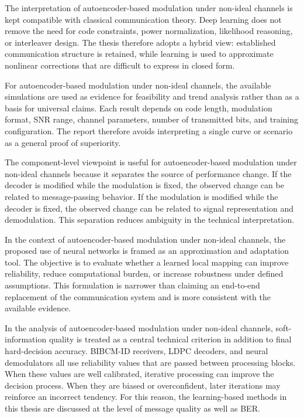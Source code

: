 The interpretation of autoencoder-based modulation under non-ideal channels is kept compatible with classical communication theory. Deep learning does not remove the need for code constraints, power normalization, likelihood reasoning, or interleaver design. The thesis therefore adopts a hybrid view: established communication structure is retained, while learning is used to approximate nonlinear corrections that are difficult to express in closed form.

For autoencoder-based modulation under non-ideal channels, the available simulations are used as evidence for feasibility and trend analysis rather than as a basis for universal claims. Each result depends on code length, modulation format, SNR range, channel parameters, number of transmitted bits, and training configuration. The report therefore avoids interpreting a single curve or scenario as a general proof of superiority.

The component-level viewpoint is useful for autoencoder-based modulation under non-ideal channels because it separates the source of performance change. If the decoder is modified while the modulation is fixed, the observed change can be related to message-passing behavior. If the modulation is modified while the decoder is fixed, the observed change can be related to signal representation and demodulation. This separation reduces ambiguity in the technical interpretation.

In the context of autoencoder-based modulation under non-ideal channels, the proposed use of neural networks is framed as an approximation and adaptation tool. The objective is to evaluate whether a learned local mapping can improve reliability, reduce computational burden, or increase robustness under defined assumptions. This formulation is narrower than claiming an end-to-end replacement of the communication system and is more consistent with the available evidence.

In the analysis of autoencoder-based modulation under non-ideal channels, soft-information quality is treated as a central technical criterion in addition to final hard-decision accuracy. BIBCM-ID receivers, LDPC decoders, and neural demodulators all use reliability values that are passed between processing blocks. When these values are well calibrated, iterative processing can improve the decision process. When they are biased or overconfident, later iterations may reinforce an incorrect tendency. For this reason, the learning-based methods in this thesis are discussed at the level of message quality as well as BER.

